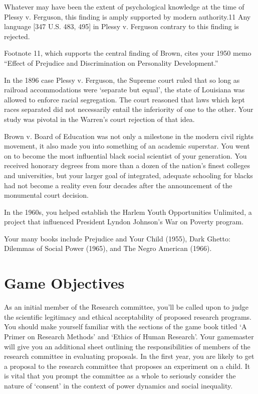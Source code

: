 \begin{refsection}
Whatever may have been the extent of psychological knowledge at the time of Plessy v. Ferguson, this finding is amply supported by modern authority.11 Any language [347 U.S. 483, 495] in Plessy v. Ferguson contrary to this finding is rejected.

Footnote 11, which supports the central finding of Brown, cites your 1950 memo ``Effect of Prejudice and Discrimination on Personality Development.''

In the 1896 case Plessy v. Ferguson, the Supreme court ruled that so long as railroad accommodations were `separate but equal', the state of Louisiana was allowed to enforce racial segregation. The court reasoned that laws which kept races separated did not necessarily entail the inferiority of one to the other. Your study was pivotal in the Warren's court rejection of that idea.

Brown v. Board of Education was not only a milestone in the modern civil rights movement, it also made you into something of an academic superstar. You went on to become the most influential black social scientist of your generation. You received honorary degrees from more than a dozen of the nation's finest colleges and universities, but your larger goal of integrated, adequate schooling for blacks had not become a reality even four decades after the announcement of the monumental court decision.

In the 1960s, you helped establish the Harlem Youth Opportunities Unlimited, a project that influenced President Lyndon Johnson's War on Poverty program.

Your many books include Prejudice and Your Child (1955), Dark Ghetto: Dilemmas of Social Power (1965), and The Negro American (1966). 

\section{Game Objectives}
\label{gameobjectives}

As an initial member of the Research committee, you'll be called upon to judge the scientific legitimacy and ethical acceptability of proposed research programs. You should make yourself familiar with the sections of the game book titled `A Primer on Research Methods' and `Ethics of Human Research'. Your gamemaster will give you an additional sheet outlining the responsibilities of members of the research committee in evaluating proposals. In the first year, you are likely to get a proposal to the research committee that proposes an experiment on a child. It is vital that you prompt the committee as a whole to seriously consider the nature of `consent' in the context of power dynamics and social inequality.


\end{refsection}
